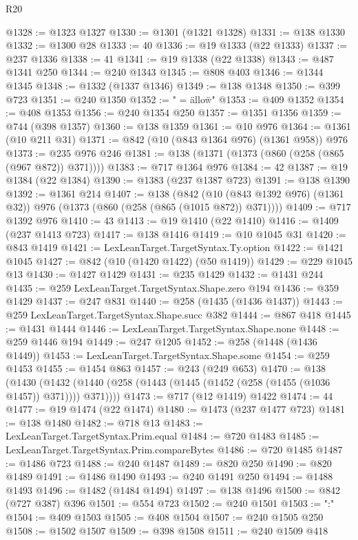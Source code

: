 \begin{lexlean}{R20}
\begin{coremodule}
@1328 := @1323 @1327
@1330 := @1301 (@1321 @1328)
@1331 := @138 @1330
@1332 := @1300 @28
@1333 := 40
@1336 := @19 @1333 (@22 @1333)
@1337 := @237 @1336
@1338 := 41
@1341 := @19 @1338 (@22 @1338)
@1343 := @487 @1341 @250
@1344 := @240 @1343
@1345 := @808 @403
@1346 := @1344 @1345
@1348 := @1332 (@1337 @1346)
@1349 := @138 @1348
@1350 := @399 @723
@1351 := @240 @1350
@1352 := " = \"allow\"\n"
@1353 := @409 @1352
@1354 := @408 @1353
@1356 := @240 @1354 @250
@1357 := @1351 @1356
@1359 := @744 (@398 @1357)
@1360 := @138 @1359
@1361 := @10 @976
@1364 := @1361 (@10 @211 @31)
@1371 := @842 (@10 (@843 @1364 @976) (@1361 @958)) @976
@1373 := @235 @976 @246
@1381 := @138 (@1371 (@1373 (@860 (@258 (@865 (@967 @872)) @371))))
@1383 := @717 @1364 @976
@1384 := 42
@1387 := @19 @1384 (@22 @1384)
@1390 := @1383 (@237 @1387 @723)
@1391 := @138 @1390
@1392 := @1361 @214
@1407 := @138
    (@842 (@10 (@843 @1392 @976) (@1361 @32)) @976 (@1373 (@860 (@258 (@865 (@1015 @872)) @371))))
@1409 := @717 @1392 @976
@1410 := 43
@1413 := @19 @1410 (@22 @1410)
@1416 := @1409 (@237 @1413 @723)
@1417 := @138 @1416
@1419 := @10 @1045 @31
@1420 := @843 @1419
@1421 := LexLeanTarget.TargetSyntax.Ty.option
@1422 := @1421 @1045
@1427 := @842 (@10 (@1420 @1422) (@50 @1419))
@1429 := @229 @1045 @13
@1430 := @1427 @1429
@1431 := @235 @1429
@1432 := @1431 @244
@1435 := @259 LexLeanTarget.TargetSyntax.Shape.zero @194
@1436 := @359 @1429
@1437 := @247 @831
@1440 := @258 (@1435 (@1436 @1437))
@1443 := @259 LexLeanTarget.TargetSyntax.Shape.succ @382
@1444 := @867 @418
@1445 := @1431 @1444
@1446 := LexLeanTarget.TargetSyntax.Shape.none
@1448 := @259 @1446 @194
@1449 := @247 @1205
@1452 := @258 (@1448 (@1436 @1449))
@1453 := LexLeanTarget.TargetSyntax.Shape.some
@1454 := @259 @1453
@1455 := @1454 @863
@1457 := @243 (@249 @653)
@1470 := @138
    (@1430 (@1432 (@1440 (@258 (@1443 (@1445 (@1452 (@258 (@1455 (@1036 @1457)) @371)))) @371))))
@1473 := @717 (@12 @1419) @1422
@1474 := 44
@1477 := @19 @1474 (@22 @1474)
@1480 := @1473 (@237 @1477 @723)
@1481 := @138 @1480
@1482 := @718 @13
@1483 := LexLeanTarget.TargetSyntax.Prim.equal
@1484 := @720 @1483
@1485 := LexLeanTarget.TargetSyntax.Prim.compareBytes
@1486 := @720 @1485
@1487 := @1486 @723
@1488 := @240 @1487
@1489 := @820 @250
@1490 := @820 @1489
@1491 := @1486 @1490
@1493 := @240 @1491 @250
@1494 := @1488 @1493
@1496 := @1482 (@1484 @1494)
@1497 := @138 @1496
@1500 := @842 (@727 @387) @396
@1501 := @554 @723
@1502 := @240 @1501
@1503 := ":"
@1504 := @409 @1503
@1505 := @408 @1504
@1507 := @240 @1505 @250
@1508 := @1502 @1507
@1509 := @398 @1508
@1511 := @240 @1509 @418

\end{coremodule}
\end{lexlean}
